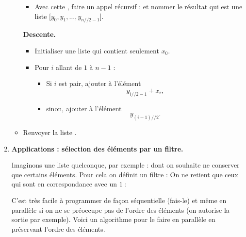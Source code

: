 \documentclass[11pt,class=report,crop=false]{standalone}
\begin{document}
\begin{activite}
\begin{enumerate}
\begin{algorithme}
\begin{itemize}
\begin{itemize}
    \item Avec cette , faire un appel récursif  :    
     et nommer le résultat  qui est une liste $[y_0,y_1,\ldots,y_{n//2-1}$].
    
  \end{itemize}       
     
   \textbf{Descente.}
   
  \begin{itemize}

    \item Initialiser une liste  qui contient seulement $x_0$.
     
    \item Pour $i$ allant de $1$ à $n-1$ :
    \begin{itemize}
      \item Si $i$ est pair, ajouter à  l'élément 
      $$y_{i//2-1}+x_i,$$
      \item sinon, ajouter à  l'élément
      $$y_{(i-1)//2}.$$
    \end{itemize}
        
    
  \end{itemize}   
    
 
  
  \item Renvoyer la liste .
\end{itemize}  
\end{algorithme}
        
    
    
    
    \item \textbf{Applications : sélection des éléments par un filtre.}
    
    Imaginons une liste quelconque, par exemple :  
    dont on souhaite ne conserver que certains éléments. Pour cela on définit un filtre :  
    On ne retient que ceux qui sont en correspondance avec un $1$ :    
   
    C'est très facile à programmer de façon séquentielle (fais-le) et même en parallèle si on ne se préoccupe pas de l'ordre des éléments (on autorise la sortie \ci{[15, 12, 16]} par exemple). Voici un algorithme pour le faire en parallèle en préservant l'ordre des éléments.   
    


\end{enumerate}
\end{activite}
\end{document}
